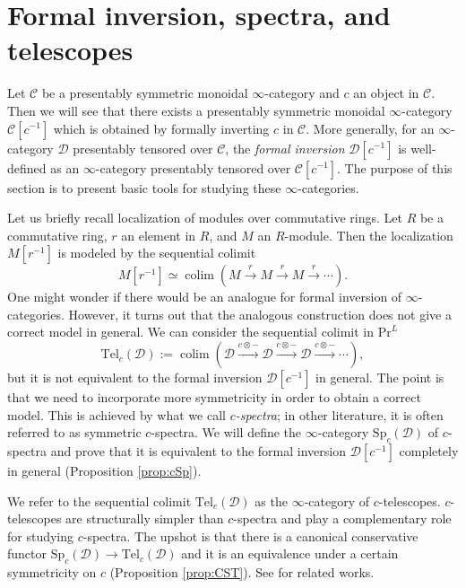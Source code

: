 \documentclass{amsart}
\theoremstyle{plain}
\theoremstyle{definition}
\theoremstyle{remark}
\numberwithin{equation}{theorem}
\newcommand{\mcal}[1]{\mathcal{#1}}
\renewcommand{\Pr}{\mathrm{Pr}}
\newcommand{\Sp}{\mathrm{Sp}}
\newcommand{\Tel}{\mathrm{Tel}}
\newcommand{\colim}{\operatorname*{colim}}
\begin{document}
\newpage

\section{Formal inversion, spectra, and telescopes}\label{IST}

Let $\mcal{C}$ be a presentably symmetric monoidal $\infty$-category and $c$ an object in $\mcal{C}$.
Then we will see that there exists a presentably symmetric monoidal $\infty$-category $\mcal{C}[c^{-1}]$ which is obtained by formally inverting $c$ in $\mcal{C}$.
More generally, for an $\infty$-category $\mcal{D}$ presentably tensored over $\mcal{C}$, the \textit{formal inversion} $\mcal{D}[c^{-1}]$ is well-defined as an $\infty$-category presentably tensored over $\mcal{C}[c^{-1}]$.
The purpose of this section is to present basic tools for studying these $\infty$-categories.

Let us briefly recall localization of modules over commutative rings.
Let $R$ be a commutative ring, $r$ an element in $R$, and $M$ an $R$-module.
Then the localization $M[r^{-1}]$ is modeled by the sequential colimit
\[
	M[r^{-1}] \simeq \colim(M\xrightarrow{r}M\xrightarrow{r}M\xrightarrow{r}\cdots).
\]
One might wonder if there would be an analogue for formal inversion of $\infty$-categories.
However, it turns out that the analogous construction does not give a correct model in general.
We can consider the sequential colimit in $\Pr^L$
\[
	\Tel_c(\mcal{D}) := \colim(\mcal{D}\xrightarrow{c\otimes-}\mcal{D}\xrightarrow{c\otimes-}\mcal{D}\xrightarrow{c\otimes-}\cdots),
\]
but it is not equivalent to the formal inversion $\mcal{D}[c^{-1}]$ in general.
The point is that we need to incorporate more symmetricity in order to obtain a correct model.
This is achieved by what we call \textit{$c$-spectra}; in other literature, it is often referred to as symmetric $c$-spectra.
We will define the $\infty$-category $\Sp_c(\mcal{D})$ of $c$-spectra and prove that it is equivalent to the formal inversion $\mcal{D}[c^{-1}]$ completely in general (Proposition \ref{prop:cSp}).

We refer to the sequential colimit $\Tel_c(\mcal{D})$ as the $\infty$-category of $c$-telescopes.
$c$-telescopes are structurally simpler than $c$-spectra and play a complementary role for studying $c$-spectra.
The upshot is that there is a canonical conservative functor $\Sp_c(\mcal{D})\to\Tel_c(\mcal{D})$ and it is an equivalence under a certain symmetricity on $c$ (Proposition \ref{prop:CST}).
See \cite{Ho,Ro} for related works.
\end{document}
